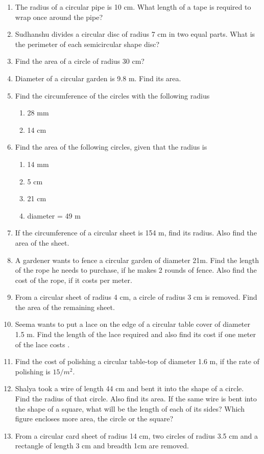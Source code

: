 \begin{enumerate}[label=\thesection.\arabic*, ref=\thesection.\theenumi]
\item The radius of a circular pipe is 10 cm. What length of a tape is required to wrap once around the pipe?
\item Sudhanshu divides a circular disc of radius 7 cm in two equal parts. What is the perimeter of each semicircular shape disc?
\item Find the area of a circle of radius 30 cm?
\item Diameter of a circular garden is 9.8 m. Find its area.
\item Find the circumference of the circles with the following radius  
	\begin{enumerate}
		\item 28 mm
\item  14 cm
\end{enumerate}
\item  Find the area of the following circles, given that the radius is
	\begin{enumerate}
\item 14 mm 
\item 5 cm
\item 21 cm 
\item  diameter = 49 m
\end{enumerate}
\item If the circumference of a circular sheet is 154 m, find its radius. Also find the area of the sheet. 
\item A gardener wants to fence a circular garden of diameter 21m. Find the length of the rope he needs to purchase, if he makes 2 rounds of fence. Also find the cost of the rope, if it costs  per meter. 
\item  From a circular sheet of radius 4 cm, a circle of radius 3 cm is removed. Find the area of the remaining sheet. 
\item Seema wants to put a lace on the edge of a circular table cover of diameter 1.5 m. Find the length of the lace required and also find its cost if one meter of the lace costs
. 
\item Find the cost of polishing a circular table-top of diameter 1.6 m, if the rate of polishing is \rupee $15/m^2$. 
\item Shalya took a wire of length 44 cm and bent it into the shape of a circle. Find the radius of that circle. Also find its area. If the same wire is bent into the shape of a square, what will be the length of each of its sides? Which figure encloses more
area, the circle or the square? 
\item From a circular card sheet of radius 14 cm, two circles of radius 3.5 cm and a rectangle of length 3 cm and breadth 1cm are removed. 

\end{enumerate}
